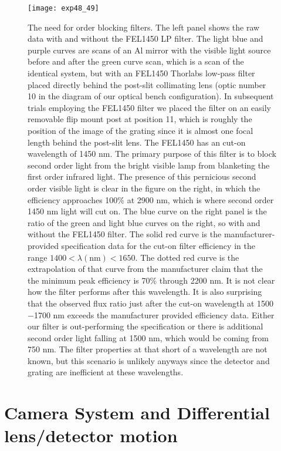 \begin{figure}
    \texttt{[image: exp48\_49]}
  \caption[FEL1450 LP filter]{The need for order blocking filters.  The left panel shows the raw data with and without the FEL1450 LP filter.  The light blue and purple curves are scans of an Al mirror with the visible light source before and after the green curve scan, which is a scan of the identical system, but with an FEL1450 Thorlabs low-pass filter placed directly behind the post-slit collimating lens (optic number 10 in the diagram of our optical bench configuration).  In subsequent trials employing the FEL1450 filter we placed the filter on an easily removable flip mount post at position 11, which is roughly the position of the image of the grating since it is almost one focal length behind the post-slit lens.  The FEL1450 has an cut-on wavelength of 1450 nm.  The primary purpose of this filter is to block second order light from the bright visible lamp from blanketing the first order infrared light.  The presence of this pernicious second order visible light is clear in the figure on the right, in which the efficiency approaches 100\% at 2900 nm, which is where second order 1450 nm light will cut on.  The blue curve on the right panel is the ratio of the green and light blue curves on the right, so with and without the FEL1450 filter.  The solid red curve is the manufacturer-provided specification data for the cut-on filter efficiency in the range $1400 < \lambda(\mathrm{nm}) < 1650 $.  The dotted red curve is the extrapolation of that curve from the manufacturer claim that the the minimum peak efficiency is 70\% through 2200 nm.  It is not clear how the filter performs after this wavelength.  It is also surprising that the observed flux ratio just after the cut-on wavelength at 1500$-$1700 nm exceeds the manufacturer provided efficiency data.  Either our filter is out-performing the specification or there is additional second order light falling at 1500 nm, which would be coming from 750 nm.  The filter properties at that short of a wavelength are not known, but this scenario is unlikely anyways since the detector and grating are inefficient at these wavelengths.}
\end{figure}

\section{Camera System and Differential lens/detector motion}
